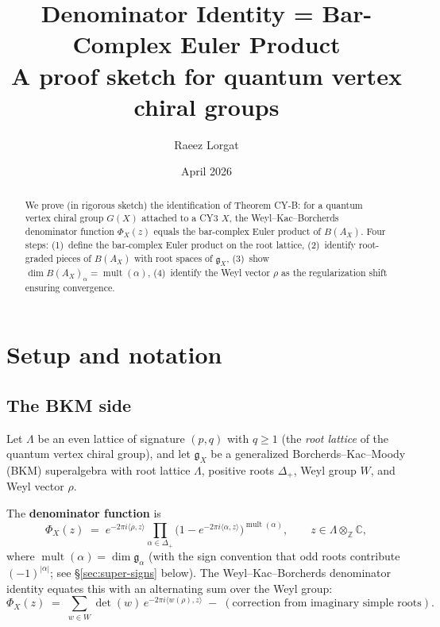 \documentclass[11pt]{article}
\title{Denominator Identity = Bar-Complex Euler Product\\[6pt]
\large A proof sketch for quantum vertex chiral groups}
\author{Raeez Lorgat}
\date{April 2026}
\theoremstyle{definition}
\theoremstyle{remark}
\DeclareMathOperator{\mult}{mult}
\newcommand{\frakg}{\mathfrak{g}}
\begin{document}
\maketitle

\begin{abstract}
We prove (in rigorous sketch) the identification of Theorem CY-B: for a quantum vertex chiral group $G(X)$ attached to a CY3 $X$, the Weyl--Kac--Borcherds denominator function $\Phi_X(z)$ equals the bar-complex Euler product of $B(A_X)$. Four steps: (1)~define the bar-complex Euler product on the root lattice, (2)~identify root-graded pieces of $B(A_X)$ with root spaces of $\frakg_X$, (3)~show $\dim B(A_X)_\alpha = \mult(\alpha)$, (4)~identify the Weyl vector $\rho$ as the regularization shift ensuring convergence.
\end{abstract}

\tableofcontents

\section{Setup and notation}
\label{sec:setup}

\subsection{The BKM side}

Let $\Lambda$ be an even lattice of signature $(p,q)$ with $q \geq 1$
(the \emph{root lattice} of the quantum vertex chiral group), and let
$\frakg_X$ be a generalized Borcherds--Kac--Moody (BKM) superalgebra
with root lattice $\Lambda$, positive roots $\Delta_+$, Weyl group $W$,
and Weyl vector $\rho$.

The \textbf{denominator function} is
\begin{equation}
\label{eq:denom-fn}
 \Phi_X(z)
 \;=\;
 e^{-2\pi i\langle \rho, z\rangle}
 \prod_{\alpha \in \Delta_+}
 \bigl(1 - e^{-2\pi i\langle \alpha, z\rangle}\bigr)^{\mult(\alpha)},
 \qquad
 z \in \Lambda \otimes_{\mathbb{Z}} \mathbb{C},
\end{equation}
where $\mult(\alpha) = \dim \frakg_\alpha$ (with the sign convention that
odd roots contribute $(-1)^{|\alpha|}$; see \S\ref{sec:super-signs} below).
The Weyl--Kac--Borcherds denominator identity equates this with an
alternating sum over the Weyl group:
\begin{equation}
\label{eq:wkb}
 \Phi_X(z)
 \;=\;
 \sum_{w \in W} \det(w)\, e^{-2\pi i\langle w(\rho), z\rangle}
 \;-\;
 (\text{correction from imaginary simple roots}).
\end{equation}
\end{document}
